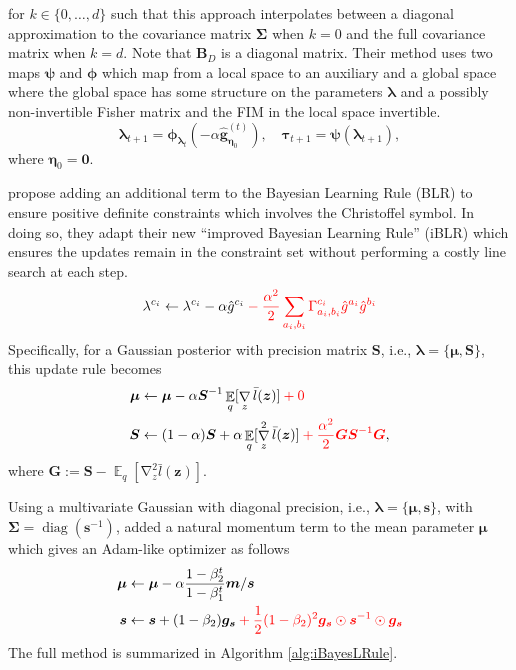 \documentclass[a4paper, 11pt, oneside]{scrartcl}
\theoremstyle{break}
\DeclareMathOperator{\diag}{diag}
\DeclareMathOperator{\Expect}{\mathbb{E}}
\DeclareMathOperator{\grad}{\nabla}
\newcommand{\matr}[1]{\boldsymbol{#1}}
\numberwithin{equation}{section}
\begin{document}
				for $k \in \{0, \dots, d\}$ such that this approach interpolates between a diagonal approximation to the covariance matrix $\matr{\Sigma}$ when $k = 0$ and the full covariance matrix when $k = d$.
				Note that $\matr{B}_D$ is a diagonal matrix.
				Their method uses two maps $\matr{\psi}$ and $\matr{\phi}$ which map from a local space to an auxiliary and a global space where the global space has some structure on the parameters $\matr{\lambda}$ and a possibly non-invertible Fisher matrix and the FIM in the local space invertible. 
				$$\matr{\lambda}_{t+1} = \matr{\phi}_{\matr{\lambda}_t}(-\alpha \matr{\hat{g}}_{\matr{\eta}_0}^{(t)}), \quad \matr{\tau}_{t+1} = \matr{\psi} (\matr{\lambda}_{t+1}),$$
				where $\matr{\eta}_0 = \matr{0}$.

				\cite{LSK20} propose adding an additional term to the Bayesian Learning Rule (BLR) to ensure positive definite constraints which involves the Christoffel symbol. 
				In doing so, they adapt their new ``improved Bayesian Learning Rule'' (iBLR) which ensures the updates remain in the constraint set without performing a costly line search at each step. 
				\begin{align*}
					\lambda^{c_i} \leftarrow \lambda^{c_i} - \alpha \hat{g}^{c_i} \color{red} - \frac{\alpha^2}{2} \sum_{a_i, b_i} \Gamma_{a_i, b_i}^{c_i} \hat{g}^{a_i} \hat{g}^{b_i} \color{black}
				\end{align*}
				Specifically, for a Gaussian posterior with precision matrix $\matr{S}$, i.e., $\matr{\lambda} = \{\matr{\mu}, \matr{S}\}$, this update rule becomes
				\begin{align*}
					\matr{\mu} &\leftarrow \matr{\mu} - \alpha \matr{S}^{-1} \Expect_q[\grad_z \bar{l}(\matr{z})] \color{red} + 0 \color{black}\\
					\matr{S} &\leftarrow (1 - \alpha) \matr{S} + \alpha \Expect_q[\grad_z^2 \bar{l}(\matr{z})] \color{red} + \frac{\alpha^2}{2} \matr{G} \matr{S}^{-1} \matr{G} \color{black},
				\end{align*}
				where $\matr{G} := \matr{S} - \Expect_q[\grad_z^2 \bar{l}(\matr{z})]$.

				Using a multivariate Gaussian with diagonal precision, i.e., $\matr{\lambda} = \{\matr{\mu}, \matr{s}\}$, with $\matr{\Sigma} = \diag (\matr{s}^{-1})$, \cite{LSK20} added a natural momentum term to the mean parameter $\matr{\mu}$ which gives an Adam-like optimizer as follows
				\begin{align*}
					\matr{\mu} &\leftarrow \matr{\mu} - \alpha \frac{1 - \beta_2^t}{1 - \beta_1^t} \matr{m} / \matr{s} \\
					\matr{s} &\leftarrow \matr{s} + (1 - \beta_2) \matr{g_s} \color{red} + \frac{1}{2} (1 - \beta_2)^2 \matr{g_s} \odot \matr{s}^{-1} \odot \matr{g_s} \color{black}
				\end{align*}
				The full method is summarized in Algorithm \ref{alg:iBayesLRule}.
\end{document}
